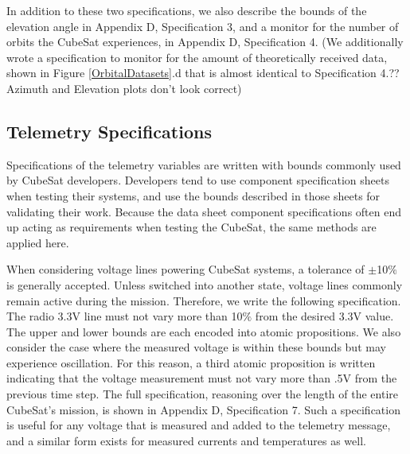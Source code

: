 \documentclass[conf]{new-aiaa}
\begin{document}
In addition to these two specifications, we also describe the bounds of the elevation angle in Appendix D, Specification 3, and a monitor for the number of orbits the CubeSat experiences, in Appendix D, Specification 4. (We additionally wrote a specification to monitor for the amount of theoretically received data, shown in Figure \ref{OrbitalDatasets}.d that is almost identical to Specification 4.?? Azimuth and Elevation plots don't look correct)

\subsection{Telemetry Specifications}

Specifications of the telemetry variables are written with bounds commonly used by CubeSat developers. Developers tend to use component specification sheets when testing their systems, and use the bounds described in those sheets for validating their work. Because the data sheet component specifications often end up acting as requirements when testing the CubeSat, the same methods are applied here.%

When considering voltage lines powering CubeSat systems, a tolerance of $\pm$10$\%$ is generally accepted. Unless switched into another state, voltage lines commonly remain active during the mission. Therefore, we write the following specification. The radio 3.3V line must not vary more than 10$\%$ from the desired 3.3V value. The upper and lower bounds are each encoded into atomic propositions. We also consider the case where the measured voltage is within these bounds but may experience oscillation. For this reason, a third atomic proposition is written indicating that the voltage measurement must not vary more than .5V from the previous time step. The full specification, reasoning over the length of the entire CubeSat's mission, is shown in Appendix D, Specification 7. Such a specification is useful for any voltage that is measured and added to the telemetry message, and a similar form exists for measured currents and temperatures as well.
\end{document}
